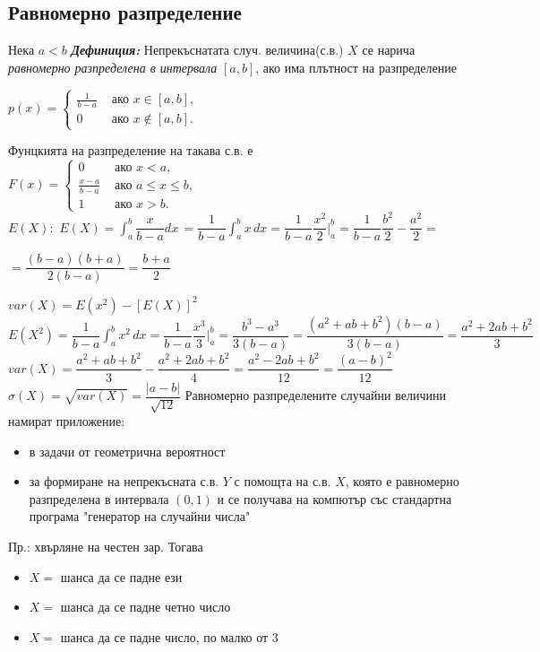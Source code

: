 \documentclass[11pt]{article} %
\newcommand{\italicBold}[1]{\textbf{\emph{#1}}}
\newcommand{\definition}{\italicBold{Дефиниция: }}
\newcommand{\integral}[4]{\displaystyle \int_{#1}^{#2}#3\,#4}
\begin{document}
\subsection{Равномерно разпределение}
Нека $a<b$
\definition Непрекъснатата случ. величина(с.в.) $X$ се нарича \textit{равномерно разпределена в интервала} $[a,b]$, ако има плътност на разпределение \\
\centerline{$p(x)=
\begin{cases} 
      \frac{1}{b-a} & \text{ ако } x \in [a,b],\\
      0 & \text{ ако } x \not\in [a,b].
\end{cases}$}
Фунцкията на разпределение на такава с.в. е \\
$F(x) = 
\begin{cases} 
      0 & \text{ ако } x < a,\\
      \frac{x-a}{b-a} & \text{ ако } a \leq x \leq b,\\
      1 & \text{ ако } x > b.
\end{cases}$\\
\textbf{$E(X):$} $E(X)=\integral{a}{b}{\dfrac{x}{b-a}{dx}}=\dfrac{1}{b-a}\integral{a}{b}{x}{dx}=\dfrac{1}{b-a}\dfrac{x^{2}}{2}\bigg\rvert^{b}_{a}=\dfrac{1}{b-a}\dfrac{b^{2}}{2}-\dfrac{a^{2}}{2}=$\\
\centerline{$=\dfrac{(b-a)(b+a)}{2(b-a)}=\dfrac{b+a}{2}$}
$var(X)=E(x^{2})-[E(X)]^{2}$\\
$E(X^{2})=\dfrac{1}{b-a}\integral{a}{b}{x^{2}}{dx}=\dfrac{1}{b-a}\dfrac{x^{3}}{3}\bigg\rvert^{b}_{a}=\dfrac{b^{3}-a^{3}}{3(b-a)}=\dfrac{(a^{2}+ab+b^{2})(b-a)}{3(b-a)}=\dfrac{a^{2}+2ab+b^{2}}{3}$\\
$var(X)=\dfrac{a^{2}+ab+b^{2}}{3}-\dfrac{a^{2}+2ab+b^{2}}{4}=\dfrac{a^{2}-2ab+b^{2}}{12}=\dfrac{(a-b)^{2}}{12}$\\
$\sigma(X)=\sqrt{var(X)}=\dfrac{|a-b|}{\sqrt{12}}$
\newpage
Равномерно разпределените случайни величини намират приложение: 
\begin{itemize}
	\item в задачи от геометрична вероятност\\
	\item за формиране на непрекъсната с.в. $Y$ с помощта на с.в. $X$, която е равномерно разпределена в интервала $(0,1)$ и се получава на компютър със стандартна програма "генератор на случайни числа"\\
\end{itemize}
Пр.: хвърляне на честен зар. Тогава
\begin{itemize}
	\item $X=$ шанса да се падне ези\\
	\item $X=$ шанса да се падне четно число\\
	\item $X=$ шанса да се падне число, по малко от 3\\
\end{itemize}
\end{document}
